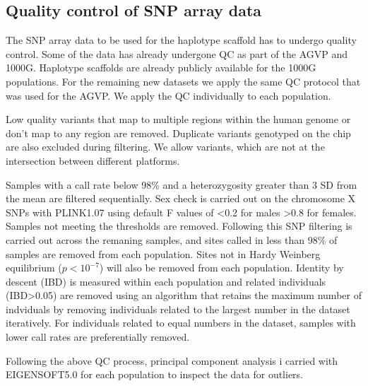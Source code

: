 \subsection{Quality control of SNP array data}
The SNP array data to be used for the haplotype scaffold has to undergo quality control. Some of the data has already undergone QC as part of the AGVP\cite{Gurdasani2015} and 1000G\cite{1000G2012}. Haplotype scaffolds are already publicly available for the 1000G populations. For the remaining new datasets we apply the same QC protocol that was used for the AGVP. We apply the QC individually to each population.

Low quality variants that map to multiple regions within the human genome or don't map to any region are removed. Duplicate variants genotyped on the chip are also excluded during filtering. We allow variants, which are not at the intersection between different platforms.

Samples with a call rate below 98\% and a heterozygosity greater than 3 SD from the mean are filtered sequentially. Sex check is carried out on the chromosome X SNPs with PLINK1.07 using default F values of \textless0.2 for males \textgreater0.8 for females. Samples not meeting the thresholds are removed. Following this SNP filtering is carried out across the remaning samples, and sites called in less than 98\% of samples are removed from each population. Sites not in Hardy Weinberg equilibrium ($p<10^{-7}$) will also be removed from each population. Identity by descent (IBD) is measured within each population and related individuals (IBD\textgreater0.05) are removed using an algorithm that retains the maximum number of indviduals by removing individuals related to the largest number in the dataset iteratively. For individuals related to equal numbers in the dataset, samples with lower call rates are preferentially removed.

Following the above QC process, principal component analysis i carried with EIGENSOFT5.0 for each population to inspect the data for outliers.